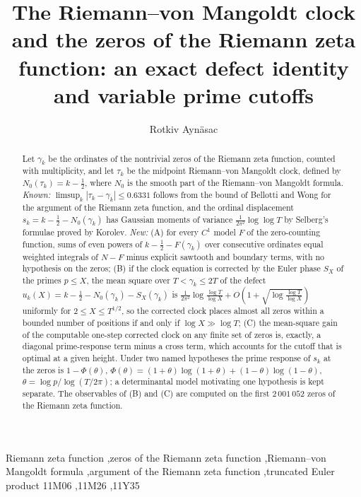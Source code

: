 \documentclass[preprint,12pt]{elsarticle}
\numberwithin{equation}{section}
\theoremstyle{plain}
\theoremstyle{definition}
\theoremstyle{remark}
\newcommand{\NO}{N_0}
\begin{document}
\begin{frontmatter}
\title{The Riemann--von Mangoldt clock and the zeros of the Riemann zeta function: an exact defect identity and variable prime cutoffs}
\author{Rotkiv Ayn\"asac}

\begin{abstract}
Let $\gamma_k$ be the ordinates of the nontrivial zeros of the Riemann zeta function, counted with multiplicity, and let $\tau_k$ be the midpoint Riemann--von Mangoldt clock, defined by $\NO(\tau_k)=k-\frac12$, where $\NO$ is the smooth part of the Riemann--von Mangoldt formula. \emph{Known:} $\limsup_k|\tau_k-\gamma_k|\le0.6331$ follows from the bound of Bellotti and Wong for the argument of the Riemann zeta function, and the ordinal displacement $s_k=k-\frac12-\NO(\gamma_k)$ has Gaussian moments of variance $\frac1{2\pi^2}\log\log T$ by Selberg's formulae proved by Korolev. \emph{New:} (A) for every $C^1$ model $F$ of the zero-counting function, sums of even powers of $k-\frac12-F(\gamma_k)$ over consecutive ordinates equal weighted integrals of $N-F$ minus explicit sawtooth and boundary terms, with no hypothesis on the zeros; (B) if the clock equation is corrected by the Euler phase $S_X$ of the primes $p\le X$, the mean square over $T<\gamma_k\le2T$ of the defect $u_k(X)=k-\frac12-\NO(\gamma_k)-S_X(\gamma_k)$ is $\frac1{2\pi^2}\log\frac{\log T}{\log X}+O(1+\sqrt{\log\frac{\log T}{\log X}})$ uniformly for $2\le X\le T^{1/2}$, so the corrected clock places almost all zeros within a bounded number of positions if and only if $\log X\gg\log T$; (C) the mean-square gain of the computable one-step corrected clock on any finite set of zeros is, exactly, a diagonal prime-response term minus a cross term, which accounts for the cutoff that is optimal at a given height. Under two named hypotheses the prime response of $s_k$ at the zeros is $1-\Phi(\theta)$, $\Phi(\theta)=(1+\theta)\log(1+\theta)+(1-\theta)\log(1-\theta)$, $\theta=\log p/\log(T/2\pi)$; a determinantal model motivating one hypothesis is kept separate. The observables of (B) and (C) are computed on the first $2\,001\,052$ zeros of the Riemann zeta function.
\end{abstract}

\begin{keyword}
Riemann zeta function \sep zeros of the Riemann zeta function \sep Riemann--von Mangoldt formula \sep argument of the Riemann zeta function \sep truncated Euler product
\MSC[2020] 11M06 \sep 11M26 \sep 11Y35
\end{keyword}
\end{frontmatter}
\end{document}
